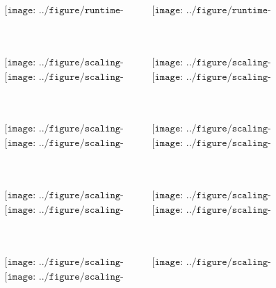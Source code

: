 \begin{figure}[htb]
    \centering
    $\begin{array}{cc}
    \texttt{[image: ../figure/runtime-N\_1024-T\_100.pdf]} & 
    \texttt{[image: ../figure/runtime-N\_1024-T\_200.pdf]} \\
    \end{array}$ 
    \caption{~}
    \label{fig:runtime4}
\end{figure}

\begin{figure}[htb]
    \centering
    $\begin{array}{cc}
    \texttt{[image: ../figure/scaling-cores\_2-T\_100.pdf]} & 
    \texttt{[image: ../figure/scaling-cores\_2-T\_200.pdf]} \\
    \texttt{[image: ../figure/scaling-cores\_2-T\_500.pdf]} & 
    \texttt{[image: ../figure/scaling-cores\_4-T\_100.pdf]} \\
    \end{array}$ 
    \caption{~}
    \label{fig:scaling1}
\end{figure}

\begin{figure}[htb]
    \centering
    $\begin{array}{cc}
    \texttt{[image: ../figure/scaling-cores\_4-T\_200.pdf]} & 
    \texttt{[image: ../figure/scaling-cores\_4-T\_500.pdf]} \\
    \texttt{[image: ../figure/scaling-cores\_8-T\_100.pdf]} & 
    \texttt{[image: ../figure/scaling-cores\_8-T\_200.pdf]} \\
    \end{array}$ 
    \caption{~}
    \label{fig:scaling2}
\end{figure}

\begin{figure}[htb]
    \centering
    $\begin{array}{cc}
    \texttt{[image: ../figure/scaling-cores\_8-T\_500.pdf]} & 
    \texttt{[image: ../figure/scaling-cores\_16-T\_100.pdf]} \\
    \texttt{[image: ../figure/scaling-cores\_16-T\_200.pdf]} & 
    \texttt{[image: ../figure/scaling-cores\_16-T\_500.pdf]} \\
    \end{array}$ 
    \caption{~}
    \label{fig:scaling3}
\end{figure}

\begin{figure}[htb]
    \centering
    $\begin{array}{cc}
    \texttt{[image: ../figure/scaling-cores\_32-T\_100.pdf]} & 
    \texttt{[image: ../figure/scaling-cores\_32-T\_200.pdf]} \\
    \texttt{[image: ../figure/scaling-cores\_32-T\_500.pdf]} &
    \end{array}$ 
    \caption{~}
    \label{fig:scaling4}
\end{figure}

